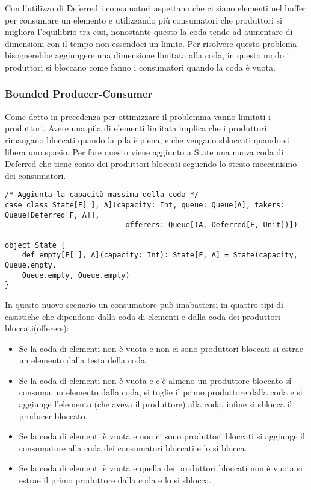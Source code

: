 \noindent Con l’utilizzo di Deferred i consumatori aspettano che ci siano elementi nel buffer per consumare un elemento e utilizzando più consumatori che produttori si migliora l’equilibrio tra essi, nonostante questo la coda tende ad aumentare di dimensioni con il tempo non essendoci un limite. Per risolvere questo problema bisognerebbe aggiungere una dimensione limitata alla coda, in questo modo i produttori si bloccano come fanno i consumatori quando la coda è vuota.

\subsubsection{Bounded Producer-Consumer}
Come detto in precedenza per ottimizzare il problemma vanno limitati i produttori. Avere una pila di elementi limitata implica che i produttori rimangano bloccati quando la pila è piena, e che vengano sbloccati quando si libera uno spazio. Per fare questo viene aggiunto a State una nuova coda di Deferred che tiene conto dei produttori bloccati seguendo lo stesso meccanismo dei consumatori.

\begin{verbatim}
/* Aggiunta la capacità massima della coda */
case class State[F[_], A](capacity: Int, queue: Queue[A], takers: Queue[Deferred[F, A]],
                            offerers: Queue[(A, Deferred[F, Unit])])

object State {
    def empty[F[_], A](capacity: Int): State[F, A] = State(capacity, Queue.empty,
    Queue.empty, Queue.empty)
}
\end{verbatim}

\noindent In questo nuovo scenario un consumatore può imabattersi in quattro tipi di casistiche che dipendono dalla coda di elementi e dalla coda dei produttori bloccati(offerers):

\begin{itemize}
    \item Se la coda di elementi non è vuota e non ci sono produttori bloccati si estrae un elemento dalla testa della coda.
    \item Se la coda di elementi non è vuota e c’è almeno un produttore bloccato si consuma un elemento dalla coda, si toglie il primo produttore dalla coda e si aggiunge l’elemento (che aveva il produttore) alla coda, infine si sblocca il producer bloccato.
    \item Se la coda di elementi è vuota e non ci sono produttori bloccati si aggiunge il consumatore alla coda dei consumatori bloccati e lo si blocca.
    \item Se la coda di elementi è vuota e quella dei produttori bloccati non è vuota si estrae il primo produttore dalla coda e lo si sblocca.
\end{itemize}

